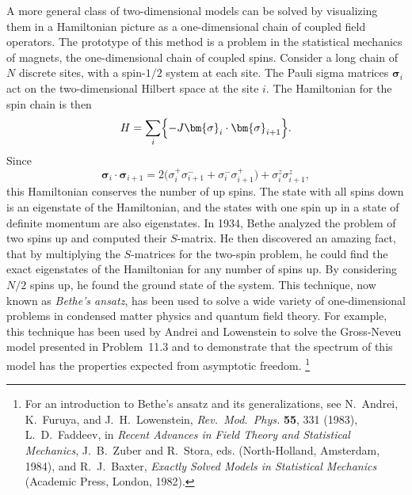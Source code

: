 A more general class of two-dimensional models can be solved by visualizing
them in a Hamiltonian picture as a one-dimensional chain of coupled field
operators.  The prototype of this method is a problem in the statistical
mechanics of magnets, the one-dimensional chain of coupled spins.  Consider
a long chain of $N$ discrete sites, with a spin-$1/2$ system at each site.
The Pauli sigma matrices $\bm{\sigma}_i$ act on the two-dimensional Hilbert
space at the site $i$.  The Hamiltonian for the spin chain is then
\begin{equation}
  H = \sum_i \Bigl\{ -J\bm{\sigma}_i\cdot\bm{\sigma}_{i+1} \Bigr\} .
  \label{eq:22.15}
\end{equation}
Since
\begin{equation}
  \bm{\sigma}_i\cdot\bm{\sigma}_{i+1} = 2\bigl( \sigma^+_i\sigma^-_{i+1}
    + \sigma^-_i\sigma^+_{i+1} \bigr) + \sigma^z_i\sigma^z_{i+1} ,
  \label{eq:22.16}
\end{equation}
this Hamiltonian conserves the number of up spins.  The state with all spins
down is an eigenstate of the Hamiltonian, and the states with one spin up in
a state of definite momentum are also eigenstates.  In 1934, Bethe analyzed
the problem of two spins up and computed their $S$-matrix.  He then
discovered an amazing fact, that by multiplying the $S$-matrices for the
two-spin problem, he could find the exact eigenstates of the Hamiltonian for
any number of spins up.  By considering $N/2$ spins up, he found the ground
state of the system.  This technique, now known as \emph{Bethe's ansatz}, has
been used to solve a wide variety of one-dimensional problems in condensed
matter physics and quantum field theory.  For example, this technique has
been used by Andrei and Lowenstein to solve the Gross-Neveu model presented
in Problem~11.3 and to demonstrate that the spectrum of this model has the
properties expected from asymptotic freedom.%
\footnote{For an introduction to Bethe's ansatz and its generalizations, see
N.~Andrei, K.~Furuya, and J.~H.~Lowenstein, \emph{Rev.\ Mod.\ Phys.}
\textbf{55}, 331 (1983), L.~D.~Faddeev, in \emph{Recent Advances in Field
Theory and Statistical Mechanics}, J.~B.~Zuber and R.~Stora, eds.
(North-Holland, Amsterdam, 1984), and R.~J.~Baxter, \emph{Exactly Solved
Models in Statistical Mechanics} (Academic Press, London, 1982).}

